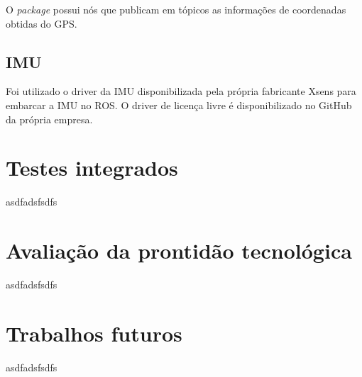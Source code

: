      O \textit{package} possui nós que publicam em tópicos as informações de coordenadas obtidas do GPS.
     
     \subsection{IMU}
    Foi utilizado o driver da IMU disponibilizada pela própria fabricante Xsens para embarcar a IMU no ROS. O driver de licença livre é disponibilizado no GitHub da própria empresa.
\section{Testes integrados}
\label{sec:testi}
asdfadsfsdfs

\section{Avaliação da prontidão tecnológica}
\label{sec:trl}
asdfadsfsdfs

\section{Trabalhos futuros}
\label{sec:trabfut}
asdfadsfsdfs




